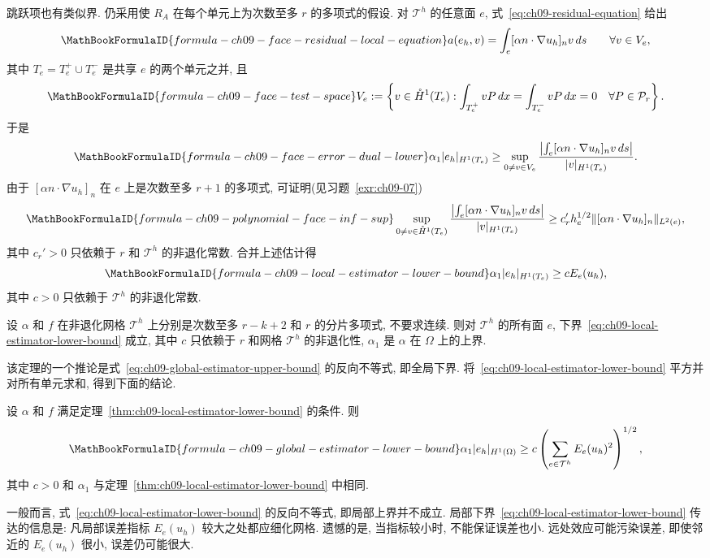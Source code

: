 跳跃项也有类似界. 仍采用使 $R_A$ 在每个单元上为次数至多 $r$ 的多项式的假设. 对 $\mathcal T^h$ 的任意面 $e$, 式~\eqref{eq:ch09-residual-equation} 给出
\[
\MathBookFormulaID{formula-ch09-face-residual-local-equation}
a(e_h,v)=\int_e[\alpha n\cdot\nabla u_h]_nv\,ds
\qquad\forall v\in V_e,
\]
其中 $T_e=T_e^+\cup T_e^-$ 是共享 $e$ 的两个单元之并, 且
\[
\MathBookFormulaID{formula-ch09-face-test-space}
V_e:=\left\{v\in\mathring H^1(T_e):
\int_{T_e^+}vP\,dx=\int_{T_e^-}vP\,dx=0
\quad\forall P\in\mathcal P_r\right\}.
\]
于是
\[
\MathBookFormulaID{formula-ch09-face-error-dual-lower}
\alpha_1|e_h|_{H^1(T_e)}
\geq\sup_{0\neq v\in V_e}
\frac{\left|\int_e[\alpha n\cdot\nabla u_h]_nv\,ds\right|}{|v|_{H^1(T_e)}}.
\]
由于 $[\alpha n\cdot\nabla u_h]_n$ 在 $e$ 上是次数至多 $r+1$ 的多项式, 可证明(见习题~\ref{exr:ch09-07})
\begin{equation}
\MathBookFormulaID{formula-ch09-polynomial-face-inf-sup}
\label{eq:ch09-polynomial-face-inf-sup}
\sup_{0\neq v\in\mathring H^1(T_e)}
\frac{\left|\int_e[\alpha n\cdot\nabla u_h]_nv\,ds\right|}{|v|_{H^1(T_e)}}
\geq c_r'h_e^{1/2}\|[\alpha n\cdot\nabla u_h]_n\|_{L^2(e)},
\end{equation}
其中 $c_r'>0$ 只依赖于 $r$ 和 $\mathcal T^h$ 的非退化常数. 合并上述估计得
\begin{equation}
\MathBookFormulaID{formula-ch09-local-estimator-lower-bound}
\label{eq:ch09-local-estimator-lower-bound}
\alpha_1|e_h|_{H^1(T_e)}\geq cE_e(u_h),
\end{equation}
其中 $c>0$ 只依赖于 $\mathcal T^h$ 的非退化常数.

\begin{Theorem}
\label{thm:ch09-local-estimator-lower-bound}
设 $\alpha$ 和 $f$ 在非退化网格 $\mathcal T^h$ 上分别是次数至多 $r-k+2$ 和 $r$ 的分片多项式, 不要求连续. 则对 $\mathcal T^h$ 的所有面 $e$, 下界~\eqref{eq:ch09-local-estimator-lower-bound} 成立, 其中 $c$ 只依赖于 $r$ 和网格 $\mathcal T^h$ 的非退化性, $\alpha_1$ 是 $\alpha$ 在 $\Omega$ 上的上界.
\end{Theorem}

该定理的一个推论是式~\eqref{eq:ch09-global-estimator-upper-bound} 的反向不等式, 即全局下界. 将~\eqref{eq:ch09-local-estimator-lower-bound} 平方并对所有单元求和, 得到下面的结论.

\begin{Theorem}
\label{thm:ch09-global-estimator-lower-bound}
设 $\alpha$ 和 $f$ 满足定理~\ref{thm:ch09-local-estimator-lower-bound} 的条件. 则
\[
\MathBookFormulaID{formula-ch09-global-estimator-lower-bound}
\alpha_1|e_h|_{H^1(\Omega)}
\geq c\left(\sum_{e\in\mathcal T^h}E_e(u_h)^2\right)^{1/2},
\]
其中 $c>0$ 和 $\alpha_1$ 与定理~\ref{thm:ch09-local-estimator-lower-bound} 中相同.
\end{Theorem}

一般而言, 式~\eqref{eq:ch09-local-estimator-lower-bound} 的反向不等式, 即局部上界并不成立. 局部下界~\eqref{eq:ch09-local-estimator-lower-bound} 传达的信息是: 凡局部误差指标 $E_e(u_h)$ 较大之处都应细化网格. 遗憾的是, 当指标较小时, 不能保证误差也小. 远处效应可能污染误差, 即使邻近的 $E_e(u_h)$ 很小, 误差仍可能很大.
